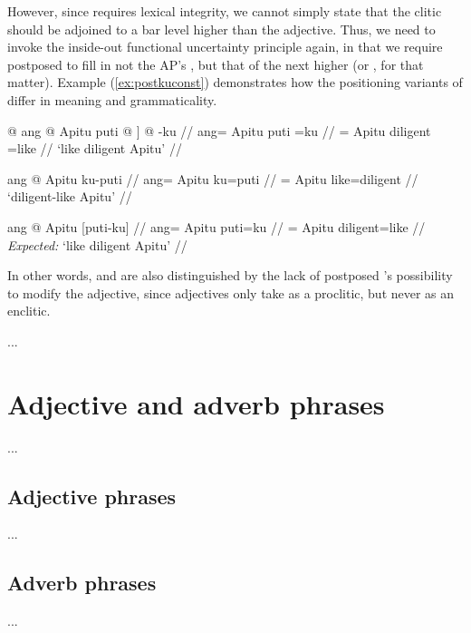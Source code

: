 \xe

However, since \Lfg{} requires lexical integrity, we cannot simply state that
the clitic should be adjoined to a bar level higher than the adjective. Thus,
we need to invoke the inside-out functional uncertainty principle again, in
that we require postposed  to fill in not the AP's \Adjc{}, but
that of the next higher \GF{} (or \DF{}, for that matter). Example
(\ref{ex:postkuconst}) demonstrates how the positioning variants of
 differ in meaning and grammaticality.

\pex\label{ex:postkuconst}
\a\label{ex:postkuconst1}\begingl
	\gla {\normalfont [} @ ang @ Apitu puti @ {\normalfont ]} @ -ku //
	\glb {} ang= Apitu puti {} =ku //
	\glc {} \Aarg{}= Apitu diligent {} =like //
	\glft `like diligent Apitu' //
\endgl

\a\label{ex:postkuconst2}\begingl
	\gla ang @ Apitu ku-puti //
	\glb ang= Apitu ku=puti //
	\glc \Aarg{}= Apitu like=diligent //
	\glft `diligent-like Apitu' //
\endgl

\a\ljudge*\label{ex:postkuconst3}\begingl
	\gla ang @ Apitu {\normalfont [}puti-ku{\normalfont ]} //
	\glb ang= Apitu puti=ku //
	\glc \Aarg{}= Apitu diligent=like //
	\glft \textit{Expected:} `like diligent Apitu' //
\endgl

\xe

In other words,  and  are also
distinguished by the lack of postposed 's possibility to
modify the adjective, since adjectives only take  as a
proclitic, but never as an enclitic.

...

\section{Adjective and adverb phrases}
\label{sec:adjps-advps}

...

\subsection{Adjective phrases}
\label{subsec:adjps}

...

\subsection{Adverb phrases}
\label{subsec:advps}

...

